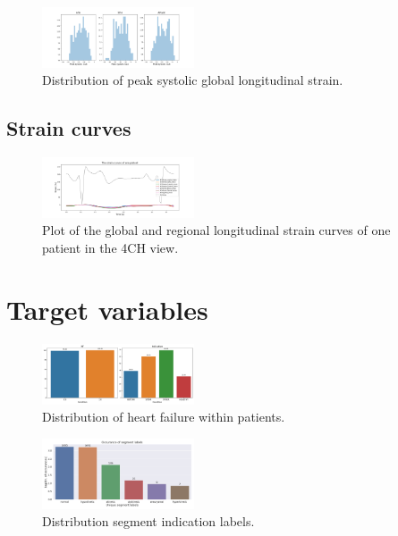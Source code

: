 \begin{figure}
    \begin{center}
    \includegraphics[width=0.4\textwidth]{data-exp/peak_sys_gls_dist.png}
    \end{center}
    \caption{Distribution of peak systolic global longitudinal strain.}
    \label{fig:}
\end{figure}

\subsection{Strain curves}

\begin{figure}
    \begin{center}
    \includegraphics[width=0.4\textwidth]{data-exp/patient_strain_curves.png}
    \end{center}
    \caption{Plot of the global and regional longitudinal strain curves of one patient in the 4CH view.}
    \label{fig:}
\end{figure}

\section{Target variables} \label{sec:target}

\begin{figure}
    \begin{center}
    \includegraphics[width=0.4\textwidth]{data-exp/hf_indication_dist.png}
    \end{center}
    \caption{Distribution of heart failure within patients.}
    \label{fig:}
\end{figure}

\begin{figure}
    \begin{center}
    \includegraphics[width=0.4\textwidth]{data-exp/segment_label_distribution.png}
    \end{center}
    \caption{Distribution segment indication labels.}
    \label{fig:}
\end{figure}
